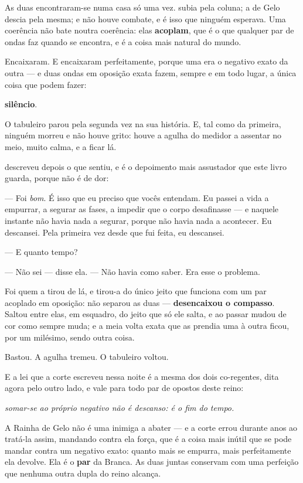 \documentclass[livro.tex]{subfiles}
\begin{document}
\medskip

As duas encontraram-se numa casa só uma vez. \Yas subia pela coluna; a de Gelo descia pela
mesma; e não houve combate, e é isso que ninguém esperava. Uma coerência não bate noutra
coerência: elas \textbf{acoplam}, que é o que qualquer par de ondas faz quando se
encontra, e é a coisa mais natural do mundo.

Encaixaram. E encaixaram perfeitamente, porque uma era o negativo exato da outra --- e
duas ondas em oposição exata fazem, sempre e em todo lugar, a única coisa que podem fazer:

\textbf{silêncio}.

\medskip

O tabuleiro parou pela segunda vez na sua história. E, tal como da primeira, ninguém
morreu e não houve grito: houve a agulha do medidor a assentar no meio, muito calma, e a
ficar lá.

\Yas descreveu depois o que sentiu, e é o depoimento mais assustador que este livro
guarda, porque não é de dor:

--- Foi \emph{bom}. É isso que eu preciso que vocês entendam. Eu passei a vida a empurrar,
a segurar as fases, a impedir que o corpo desafinasse --- e naquele instante não havia
nada a segurar, porque não havia nada a acontecer. Eu descansei. Pela primeira vez desde
que fui feita, eu descansei.

--- E quanto tempo?

--- Não sei --- disse ela. --- Não havia como saber. Era esse o problema.

\medskip

Foi \Joa quem a tirou de lá, e tirou-a do único jeito que funciona com um par acoplado em
oposição: não separou as duas --- \textbf{desencaixou o compasso}. Saltou entre elas, em
esquadro, do jeito que só ele salta, e ao passar mudou de cor como sempre muda; e a meia
volta exata que as prendia uma à outra ficou, por um milésimo, sendo outra coisa.

Bastou. A agulha tremeu. O tabuleiro voltou.

\medskip

E a lei que a corte escreveu nessa noite é a mesma dos dois co-regentes, dita agora pelo
outro lado, e vale para todo par de opostos deste reino:

\emph{somar-se ao próprio negativo não é descanso: é o fim do tempo.}

A Rainha de Gelo não é uma inimiga a abater --- e a corte errou durante anos ao tratá-la
assim, mandando contra ela força, que é a coisa mais inútil que se pode mandar contra um
negativo exato: quanto mais se empurra, mais perfeitamente ela devolve. Ela é o
\textbf{par} da Branca. As duas juntas conservam com uma perfeição que nenhuma outra
dupla do reino alcança.
\end{document}
